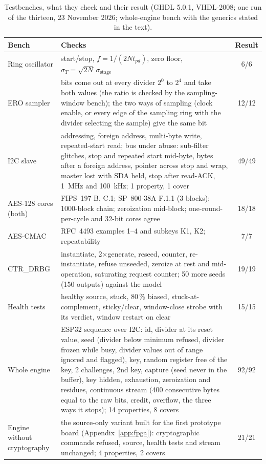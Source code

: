 \begin{table}[htbp]
\centering
\caption{Testbenches, what they check and their result (GHDL 5.0.1,
VHDL-2008; one run of the thirteen, 23 November 2026; whole-engine bench
with the generics stated in the text).}
\label{tab:tb}
\footnotesize
\begin{tabular}{@{}lp{8.4cm}c@{}}
\toprule
Bench & Checks & Result \\
\midrule
Ring oscillator & start/stop, $f = 1/(2N t_{pd})$, zero floor, $\sigma_T = \sqrt{2N}\,\sigma_{\mathrm{stage}}$ & 6/6 \\
\ac{ERO} sampler & bits come out at every divider $2^{0}$ to $2^{4}$ and take both values (the ratio is checked by the sampling-window bench); the two ways of sampling (clock enable, or every edge of the sampling ring with the divider selecting the sample) give the same bit & 12/12 \\
I2C slave & addressing, foreign address, multi-byte write, repeated-start read; bus under abuse: sub-filter glitches, stop and repeated start mid-byte, bytes after a foreign address, pointer across stop and wrap, master lost with SDA held, stop after read-ACK, 1~MHz and 100~kHz; 1 property, 1 cover & 49/49 \\
AES-128 cores (both) & FIPS~197 B, C.1; SP~800-38A F.1.1 (3 blocks); 1000-block chain; zeroization mid-block; one-round-per-cycle and 32-bit cores agree & 18/18 \\
AES-CMAC & RFC~4493 examples 1--4 and subkeys K1, K2; repeatability & 7/7 \\
CTR\_DRBG & instantiate, 2$\times$generate, reseed, counter, re-instantiate, refuse unseeded, zeroize at rest and mid-operation, saturating request counter; 50 more seeds (150 outputs) against the model & 19/19 \\
Health tests & healthy source, stuck, 80\,\% biased, stuck-at-complement, sticky/clear, window-close strobe with its verdict, window restart on clear & 15/15 \\
Whole engine & ESP32 sequence over I2C: id, divider at its reset value, seed (divider below minimum refused, divider frozen while busy, divider values out of range ignored and flagged), key, random register free of the key, 2 challenges, 2nd key, capture (seed never in the buffer), key hidden, exhaustion, zeroization and residues, continuous stream (400 consecutive bytes equal to the raw bits, credit, overflow, the three ways it stops); 14 properties, 8 covers & 92/92 \\
Engine without cryptography & the source-only variant built for the first prototype board (Appendix~\ref{app:fpga}): cryptographic commands refused, source, health tests and stream unchanged; 4 properties, 2 covers & 21/21 \\

\end{tabular}
\end{table}
